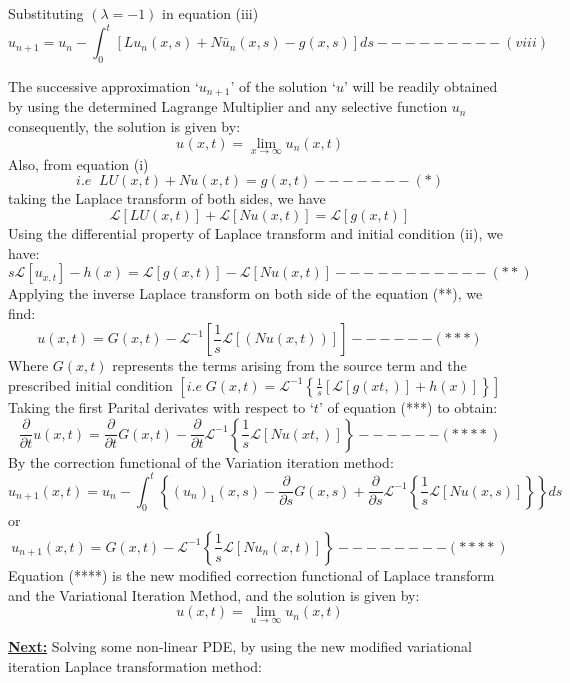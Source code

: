 \documentclass[a4paper 11pt]{article}
\newcommand{\Laplace}{\mathcal{L}}
\newcommand{\sbracket}[1]{\left[#1\right]}
\newcommand{\Un}[2]{u_{#1}(#2)}
\newcommand{\NI}{\noindent}
\newcommand{\InverseL}[1]{\Laplace^{-1}\left[#1\right]}
\newcommand{\LT}[1]{\Laplace \left[#1\right]}
\newcommand{\Unx}[1]{\Un{#1}{x,t}}
\newcommand{\InverseLx}[1]{\Laplace^{-1}\left\{ #1 \right\}}
\begin{document}
\NI Substituting $(\lambda = -1)$ in equation (iii)\\[0.2cm]
$$
u_{n+1} = u_n - \int_{0}^{t} \sbracket{L\Un{n}{x,s} + N\bar{u}_{n}(x,s) - g(x,s)}ds - - - - - - - - - (viii)
$$

\NI The successive approximation `$u_{n+1}$' of the solution `$u$' will be readily obtained by using the determined Lagrange Multiplier and any selective function $u_n$ consequently, the solution is given by: 
$$
\Un{}{x,t} = \lim\limits_{x \rightarrow \infty}\Un{n}{x,t}
$$
\newpage
Also, from equation (i)
$$
i.e\; \;  LU(x,t) + Nu(x,t) = g(x,t) - - - - - - - (*)
$$
taking the Laplace transform of both sides, we have
$$
\LT{LU(x,t)} + \LT{Nu(x,t)} = \LT{g(x,t)}
$$
Using the differential property of Laplace transform and initial condition (ii), we have:
$$
s\LT{u_{x,t}} - h(x) = \LT{g(x,t)} - \LT{Nu(x,t)} - - - - - - - - - - - (**)
$$
Applying the inverse Laplace transform on both side of the equation (**), we find:
$$
u(x,t) = G(x,t) - \InverseL{\frac{1}{s}\LT{(Nu(x,t))}} - - - - - -  (***)
$$
Where $G(x,t)$ represents the terms arising from the source term and the prescribed initial condition $\displaystyle \sbracket{ i.e \; G(x,t) = \Laplace^{-1}\left\{\frac{1}{s}\sbracket{\LT{g(xt,)}+ h(x)}\right\}}$\\[0.3cm]

\NI Taking the first Parital derivates with respect to `$t$' of equation (***) to obtain:
$$
\frac{\partial}{\partial t}u(x,t) = \frac{\partial}{\partial t}G(x,t) - \frac{\partial}{\partial t}\Laplace^{-1}\left\{ \frac{1}{s}\LT{Nu(xt,)}\right\} - - - - - - (****)
$$
By the correction functional of the Variation iteration method:
$$
\Unx{n+1} = u_n - \int_{0}^{t}\left\{ (u_n)_{1}(x,s) - \frac{\partial}{\partial s}G(x,s) + \frac{\partial}{\partial s}\InverseLx{\frac{1}{s} \LT{Nu(x,s)}} \right\}ds
$$
or
$$
\Unx{n+1} = G(x,t) - \InverseLx{\frac{1}{s}\LT{N\Un{n}{x,t}}} - - - - - - - - (****)
$$
Equation (****) is the new modified correction functional of Laplace transform and the Variational Iteration Method, and the solution is given by:
$$
u(x,t) = \lim\limits_{u \rightarrow \infty} \Unx{n}
$$

\NI \textbf{\underline{Next:}} Solving some non-linear PDE, by using the new  modified variational iteration Laplace transformation method:
\end{document}

